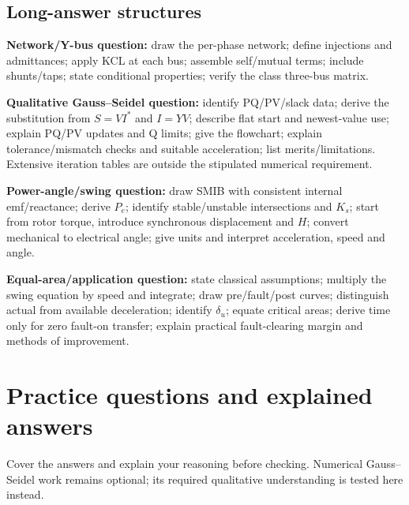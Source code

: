 \documentclass[11pt,a4paper]{article}
\newcommand{\chapterstart}[2]{\par\needspace{12\baselineskip}\section{#1}\label{#2}}
\begin{document}
\subsection{Long-answer structures}
\textbf{Network/Y-bus question:} draw the per-phase network; define injections and admittances; apply KCL at each bus; assemble self/mutual terms; include shunts/taps; state conditional properties; verify the class three-bus matrix.

\textbf{Qualitative Gauss--Seidel question:} identify PQ/PV/slack data; derive the substitution from $S=VI^*$ and $I=YV$; describe flat start and newest-value use; explain PQ/PV updates and Q limits; give the flowchart; explain tolerance/mismatch checks and suitable acceleration; list merits/limitations. Extensive iteration tables are outside the stipulated numerical requirement.

\textbf{Power-angle/swing question:} draw SMIB with consistent internal emf/reactance; derive $P_e$; identify stable/unstable intersections and $K_s$; start from rotor torque, introduce synchronous displacement and $H$; convert mechanical to electrical angle; give units and interpret acceleration, speed and angle.

\textbf{Equal-area/application question:} state classical assumptions; multiply the swing equation by speed and integrate; draw pre/fault/post curves; distinguish actual from available deceleration; identify $\delta_u$; equate critical areas; derive time only for zero fault-on transfer; explain practical fault-clearing margin and methods of improvement.

\chapterstart{Practice questions and explained answers}{practice}
Cover the answers and explain your reasoning before checking. Numerical Gauss--Seidel work remains optional; its required qualitative understanding is tested here instead.
\end{document}
